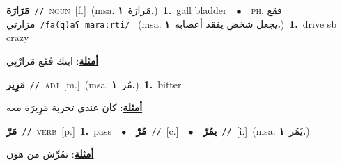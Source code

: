 \documentclass[10pt,a4paper,twoside]{article} %
\begin{document}
\begin{multicols}{2}
{\setlength\topsep{0pt}\textbf{\foreignlanguage{arabic}{مَرَارَة}}\ {\color{gray}\texttt{//}\color{black}}\ \textsc{noun}\ [f.]\ \color{gray}(msa. \foreignlanguage{arabic}{مَرارَة}~\foreignlanguage{arabic}{\textbf{١.}})\color{black}\ \textbf{1.}~gall bladder\ \ $\bullet$\ \ \textsc{ph.} \color{gray} \foreignlanguage{arabic}{فقع مرَارتي}\color{black}\ {\color{gray}\texttt{/{\sffamily fa(q)aʕ maraːrti}/}\color{black}}\ \color{gray} (msa. \foreignlanguage{arabic}{يجعل شخض يفقد أعصابه}~\foreignlanguage{arabic}{\textbf{١.}})\color{black}\ \textbf{1.}~drive sb crazy\  \begin{flushright}\color{gray}\foreignlanguage{arabic}{\textbf{\underline{\foreignlanguage{arabic}{أمثلة}}}: ابنك فَقَع مَرارْتِي}\end{flushright}\color{black}} \vspace{2mm}

{\setlength\topsep{0pt}\textbf{\foreignlanguage{arabic}{مَرِير}}\ {\color{gray}\texttt{//}\color{black}}\ \textsc{adj}\ [m.]\ \color{gray}(msa. \foreignlanguage{arabic}{مُر}~\foreignlanguage{arabic}{\textbf{١.}})\color{black}\ \textbf{1.}~bitter\  \begin{flushright}\color{gray}\foreignlanguage{arabic}{\textbf{\underline{\foreignlanguage{arabic}{أمثلة}}}: كان عندي تجربة مَرِيرَة معه}\end{flushright}\color{black}} \vspace{2mm}

{\setlength\topsep{0pt}\textbf{\foreignlanguage{arabic}{مَرّ}}\ {\color{gray}\texttt{//}\color{black}}\ \textsc{verb}\ [p.]\ \textbf{1.}~pass\ \ $\bullet$\ \ \setlength\topsep{0pt}\textbf{\foreignlanguage{arabic}{مُرّ}}\ {\color{gray}\texttt{//}\color{black}}\ [c.]\ \ $\bullet$\ \ \setlength\topsep{0pt}\textbf{\foreignlanguage{arabic}{يمُرّ}}\ {\color{gray}\texttt{//}\color{black}}\ [i.]\ \color{gray}(msa. \foreignlanguage{arabic}{يَمُر}~\foreignlanguage{arabic}{\textbf{١.}})\color{black}\  \begin{flushright}\color{gray}\foreignlanguage{arabic}{\textbf{\underline{\foreignlanguage{arabic}{أمثلة}}}: تمُرِّش من هون}\end{flushright}\color{black}} \vspace{2mm}


\end{multicols}
\end{document}
